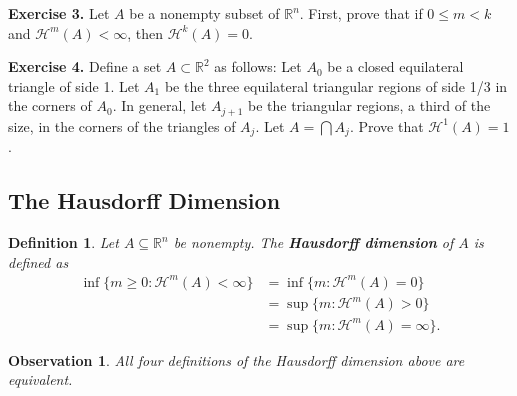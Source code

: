 \documentclass[10pt]{article}
\theoremstyle{plain}
\newtheorem{definition}{Definition}
\newtheorem{observation}{Observation}
\begin{document}
	\noindent \textbf{Exercise 3.} Let $A$ be a nonempty subset of $\mathbb{R}^n$. First, prove that if $0 \leq m < k$ and $\mathcal{H}^m(A) < \infty$, then $\mathcal{H}^k(A) = 0$. 
	
	\noindent \textbf{Exercise 4.} Define a set $A \subset \mathbb{R}^2$ as follows: Let $A_0$ be a closed equilateral triangle of side 1. Let $A_1$ be the three equilateral triangular regions of side 1/3 in the corners of $A_0$. In general, let $A_{j + 1}$ be the triangular regions, a third of the size, in the corners of the triangles of $A_j$. Let $A = \bigcap A_j$. Prove that $\mathcal{H}^1(A) = 1$. 

\newpage 
\subsection*{The Hausdorff Dimension}
\newpage 


	\begin{definition}
		Let $A \subseteq \mathbb{R}^n$ be nonempty. The \textbf{\textit{Hausdorff dimension}} of $A$ is defined as 
			\begin{align*}
				\inf\{m \geq 0 : \mathcal{H}^m(A) < \infty\} &= \inf \{m : \mathcal{H}^m(A) = 0\} \\ 
				&= \sup \{m : \mathcal{H}^m(A) > 0\} \\
				&= \sup \{m : \mathcal{H}^m(A) = \infty\}.
			\end{align*}
	\end{definition}


	\begin{observation}
		All four definitions of the Hausdorff dimension above are equivalent.
	\end{observation}
\end{document}
